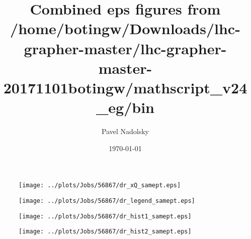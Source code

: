 \documentclass[12pt]{article}
\begin{document}
\title{Combined eps figures from /home/botingw/Downloads/lhc-grapher-master/lhc-grapher-master-20171101botingw/mathscript\_v24\_eg/bin}
\date{\today}
\author{Pavel Nadolsky}
\maketitle
\begin{figure}
\texttt{[image: ../plots/Jobs/56867/dr\_xQ\_samept.eps]}
\caption{}
\end{figure}\newpage\clearpage
\begin{figure}
\texttt{[image: ../plots/Jobs/56867/dr\_legend\_samept.eps]}
\caption{}
\end{figure}\newpage\clearpage
\begin{figure}
\texttt{[image: ../plots/Jobs/56867/dr\_hist1\_samept.eps]}
\caption{}
\end{figure}\newpage\clearpage
\begin{figure}
\texttt{[image: ../plots/Jobs/56867/dr\_hist2\_samept.eps]}
\caption{}
\end{figure}\newpage\clearpage
\end{document}
